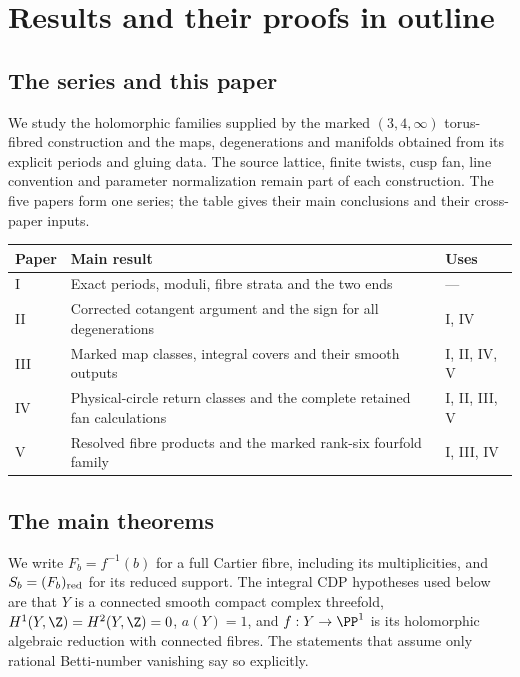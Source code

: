 \section{Results and their proofs in outline}\label{sec:results}
\subsection{The series and this paper}
We study the holomorphic families supplied by the marked
$(3,4,\infty)$ torus-fibred construction and the maps, degenerations
and manifolds obtained from its explicit periods and gluing data.
The source lattice, finite twists, cusp fan, line convention and
parameter normalization remain part of each construction. The five
papers form one series; the table gives their main conclusions and
their cross-paper inputs.
\begin{center}\small
\begin{tabularx}{\textwidth}{@{}lXl@{}}\toprule
Paper & Main result & Uses\\\midrule
I & Exact periods, moduli, fibre strata and the two ends & ---\\
II & Corrected cotangent argument and the sign for all degenerations & I, IV\\
III & Marked map classes, integral covers and their smooth outputs & I, II, IV, V\\
IV & Physical-circle return classes and the complete retained fan calculations & I, II, III, V\\
V & Resolved fibre products and the marked rank-six fourfold family & I, III, IV\\
\bottomrule\end{tabularx}\end{center}

\subsection{The main theorems}
\hypertarget{tag-03K1}{}\label{series:II:main-theorems}

We write $F_b=f^{-1}(b)$ for a full Cartier fibre, including its
multiplicities, and $S_b=(F_b)_{\rm red}$ for its reduced support.
The integral CDP hypotheses used below are that $Y$ is a connected
smooth compact complex threefold, $H^1(Y,\Z)=H^2(Y,\Z)=0$,
$a(Y)=1$, and $f:Y\to\PP^1$ is its holomorphic algebraic reduction
with connected fibres. The statements that assume only rational
Betti-number vanishing say so explicitly.

